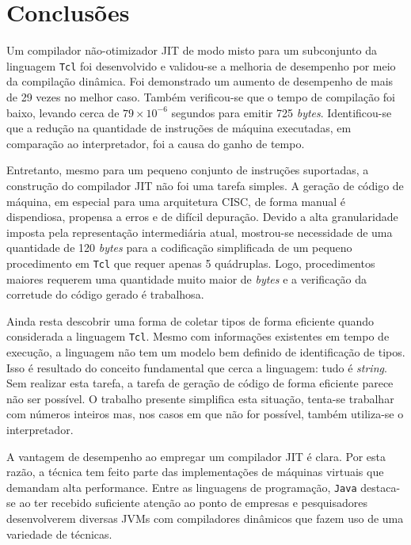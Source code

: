 \chapter{Conclusões}
\label{conclusao}

Um compilador não-otimizador JIT de modo misto para um subconjunto da
linguagem \texttt{Tcl} foi
desenvolvido e validou-se a melhoria de desempenho por meio da
compilação dinâmica. Foi demonstrado um aumento de desempenho de mais
de 29 vezes no melhor caso. Também verificou-se que o tempo
de compilação foi baixo, levando cerca de $79 \times 10^{-6}$
segundos para emitir 725 \textit{bytes}. Identificou-se que a redução
na quantidade de instruções de máquina executadas, em comparação ao
interpretador, foi a causa do ganho de tempo.

Entretanto, mesmo para um pequeno conjunto de
instruções suportadas, a construção do compilador JIT não
foi uma tarefa simples. A geração de código de máquina, em especial
para uma arquitetura CISC, de forma manual é dispendiosa, propensa a
erros e de difícil depuração. Devido a alta
granularidade imposta pela representação intermediária atual,
mostrou-se necessidade de uma quantidade de 120 \textit{bytes}
para a codificação simplificada de um pequeno procedimento em
\texttt{Tcl} que requer apenas 5 quádruplas.
Logo, procedimentos maiores requerem uma quantidade
muito maior de \textit{bytes} e a
verificação da corretude do código gerado é trabalhosa.

Ainda resta descobrir uma forma de coletar tipos de forma eficiente
quando considerada a linguagem \texttt{Tcl}. Mesmo com informações
existentes em tempo de execução, a linguagem não tem um modelo bem
definido de identificação de tipos. Isso é resultado do conceito
fundamental que cerca a linguagem: tudo é \textit{string}. Sem
realizar esta tarefa, a tarefa de
geração de código de forma eficiente parece não ser possível.
O trabalho presente simplifica esta situação, tenta-se trabalhar com
números inteiros mas, nos casos em que não for possível, também
utiliza-se o interpretador.


A vantagem de desempenho ao empregar um compilador JIT é
clara. Por esta razão, a técnica tem feito parte das implementações de
máquinas virtuais que demandam alta performance. Entre as linguagens de
programação, \texttt{Java} destaca-se
ao ter recebido suficiente atenção ao ponto de empresas e
pesquisadores desenvolverem diversas JVMs com compiladores
dinâmicos que fazem uso de uma variedade de técnicas.

